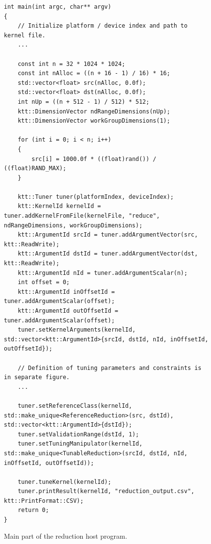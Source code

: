 \documentclass
[
    digital, %
    oneside, %
    table, %
    nolof, %
    nolot, %
    nocover %
]{fithesis3}
\begin{document}
\begin{figure}
\footnotesize
\begin{adjustwidth}{-1cm}{-1cm}
\begin{lstlisting}
int main(int argc, char** argv)
{
    // Initialize platform / device index and path to kernel file.
    ...
    
    const int n = 32 * 1024 * 1024;
    const int nAlloc = ((n + 16 - 1) / 16) * 16;
    std::vector<float> src(nAlloc, 0.0f);
    std::vector<float> dst(nAlloc, 0.0f);
    int nUp = ((n + 512 - 1) / 512) * 512;
    ktt::DimensionVector ndRangeDimensions(nUp);
    ktt::DimensionVector workGroupDimensions(1);
    
    for (int i = 0; i < n; i++)
    {
        src[i] = 1000.0f * ((float)rand()) / ((float)RAND_MAX);
    }
    
    ktt::Tuner tuner(platformIndex, deviceIndex);
    ktt::KernelId kernelId = tuner.addKernelFromFile(kernelFile, "reduce", ndRangeDimensions, workGroupDimensions);
    ktt::ArgumentId srcId = tuner.addArgumentVector(src, ktt::ReadWrite);
    ktt::ArgumentId dstId = tuner.addArgumentVector(dst, ktt::ReadWrite);
    ktt::ArgumentId nId = tuner.addArgumentScalar(n);
    int offset = 0;
    ktt::ArgumentId inOffsetId = tuner.addArgumentScalar(offset);
    ktt::ArgumentId outOffsetId = tuner.addArgumentScalar(offset);
    tuner.setKernelArguments(kernelId, std::vector<ktt::ArgumentId>{srcId, dstId, nId, inOffsetId, outOffsetId});
    
    // Definition of tuning parameters and constraints is in separate figure.
    ...
    
    tuner.setReferenceClass(kernelId, std::make_unique<ReferenceReduction>(src, dstId), std::vector<ktt::ArgumentId>{dstId});
    tuner.setValidationRange(dstId, 1);
    tuner.setTuningManipulator(kernelId, std::make_unique<TunableReduction>(srcId, dstId, nId, inOffsetId, outOffsetId));
    
    tuner.tuneKernel(kernelId);
    tuner.printResult(kernelId, "reduction_output.csv", ktt::PrintFormat::CSV);
    return 0;
}
\end{lstlisting}
\caption{Main part of the reduction host program.}
\label{reduction-example-main}
\end{adjustwidth}
\end{figure}
\end{document}

